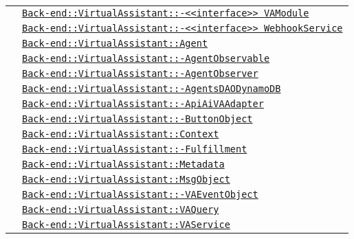 \begin{longtable}{|>{\centering}m{3cm}|m{10cm}<{\centering}|}
& \hyperref[Back-end::VirtualAssistant::<<interface>> VAModule]{\texttt{Back-end::VirtualAssistant::-\linebreak <<interface>> VAModule}}\\
& \hyperref[Back-end::VirtualAssistant::<<interface>> WebhookService]{\texttt{Back-end::VirtualAssistant::-\linebreak <<interface>> WebhookService}}\\
& \hyperref[Back-end::VirtualAssistant::Agent]{\texttt{Back-end::VirtualAssistant::Agent}}\\
& \hyperref[Back-end::VirtualAssistant::AgentObservable]{\texttt{Back-end::VirtualAssistant::-\linebreak AgentObservable}}\\
& \hyperref[Back-end::VirtualAssistant::AgentObserver]{\texttt{Back-end::VirtualAssistant::-\linebreak AgentObserver}}\\
& \hyperref[Back-end::VirtualAssistant::AgentsDAODynamoDB]{\texttt{Back-end::VirtualAssistant::-\linebreak AgentsDAODynamoDB}}\\
& \hyperref[Back-end::VirtualAssistant::ApiAiVAAdapter]{\texttt{Back-end::VirtualAssistant::-\linebreak ApiAiVAAdapter}}\\
& \hyperref[Back-end::VirtualAssistant::ButtonObject]{\texttt{Back-end::VirtualAssistant::-\linebreak ButtonObject}}\\
& \hyperref[Back-end::VirtualAssistant::Context]{\texttt{Back-end::VirtualAssistant::Context}}\\
& \hyperref[Back-end::VirtualAssistant::Fulfillment]{\texttt{Back-end::VirtualAssistant::-\linebreak Fulfillment}}\\
& \hyperref[Back-end::VirtualAssistant::Metadata]{\texttt{Back-end::VirtualAssistant::Metadata}}\\
& \hyperref[Back-end::VirtualAssistant::MsgObject]{\texttt{Back-end::VirtualAssistant::MsgObject}}\\
& \hyperref[Back-end::VirtualAssistant::VAEventObject]{\texttt{Back-end::VirtualAssistant::-\linebreak VAEventObject}}\\
& \hyperref[Back-end::VirtualAssistant::VAQuery]{\texttt{Back-end::VirtualAssistant::VAQuery}}\\
& \hyperref[Back-end::VirtualAssistant::VAService]{\texttt{Back-end::VirtualAssistant::VAService}}\\

\end{longtable}
